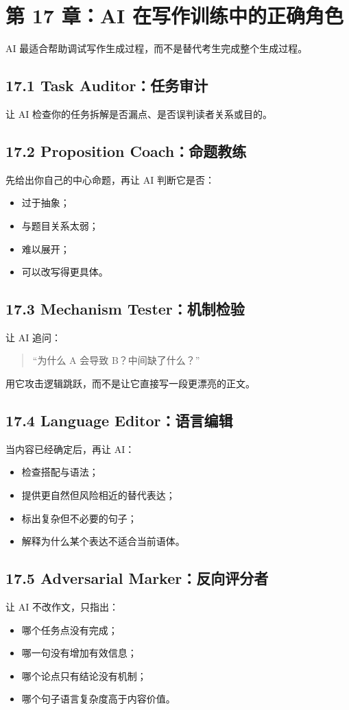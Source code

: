 \documentclass[11pt,a4paper]{ctexart}
\begin{document}
\section{第 17 章：AI 在写作训练中的正确角色}

AI 最适合帮助调试写作生成过程，而不是替代考生完成整个生成过程。

\subsection{17.1 Task Auditor：任务审计}
让 AI 检查你的任务拆解是否漏点、是否误判读者关系或目的。

\subsection{17.2 Proposition Coach：命题教练}
先给出你自己的中心命题，再让 AI 判断它是否：
\begin{itemize}
  \item 过于抽象；
  \item 与题目关系太弱；
  \item 难以展开；
  \item 可以改写得更具体。
\end{itemize}

\subsection{17.3 Mechanism Tester：机制检验}
让 AI 追问：
\begin{quote}
“为什么 A 会导致 B？中间缺了什么？”
\end{quote}
用它攻击逻辑跳跃，而不是让它直接写一段更漂亮的正文。

\subsection{17.4 Language Editor：语言编辑}
当内容已经确定后，再让 AI：
\begin{itemize}
  \item 检查搭配与语法；
  \item 提供更自然但风险相近的替代表达；
  \item 标出复杂但不必要的句子；
  \item 解释为什么某个表达不适合当前语体。
\end{itemize}

\subsection{17.5 Adversarial Marker：反向评分者}
让 AI 不改作文，只指出：
\begin{itemize}
  \item 哪个任务点没有完成；
  \item 哪一句没有增加有效信息；
  \item 哪个论点只有结论没有机制；
  \item 哪个句子语言复杂度高于内容价值。
\end{itemize}
\end{document}
